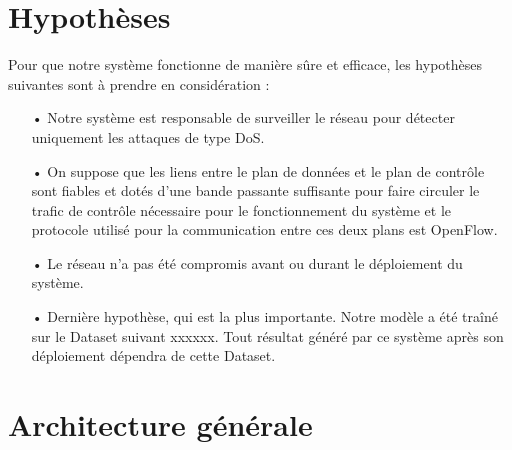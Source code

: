 \section{Hypothèses}
Pour que notre système fonctionne de manière sûre et efficace, les hypothèses suivantes sont à prendre en considération :\\
\begin{itemize}
\item[•] Notre système est responsable de surveiller le réseau pour détecter uniquement les attaques de type DoS.\\
\item[•] On suppose que les liens entre le plan de données et le plan de contrôle sont fiables et dotés d’une bande passante suffisante pour faire circuler le trafic de contrôle nécessaire pour le fonctionnement du système et le protocole utilisé pour la communication entre ces deux plans est OpenFlow.\\
\item[•] Le réseau n’a pas été compromis avant ou durant le déploiement du système.\\
\item[•] Dernière hypothèse, qui est la plus importante. Notre modèle a été traîné sur le Dataset suivant xxxxxx. Tout résultat généré par ce système après son déploiement dépendra de cette Dataset.
\end{itemize}

\section{Architecture générale}


 